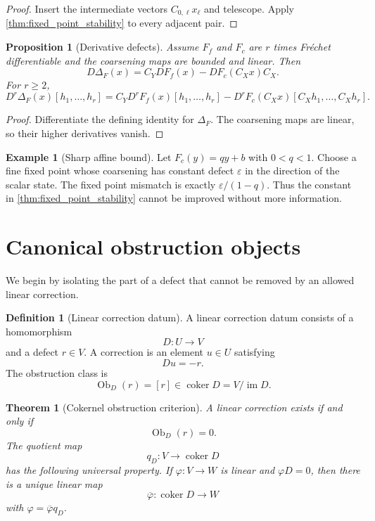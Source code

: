 \documentclass{aomart}
\newtheorem{theorem}{Theorem}[section]
\newtheorem{proposition}[proposition]{Proposition}
\theoremstyle{definition}
\newtheorem{definition}[definition]{Definition}
\newtheorem{example}[example]{Example}
\theoremstyle{remark}
\newcommand{\im}{\operatorname{im}}
\newcommand{\coker}{\operatorname{coker}}
\newcommand{\Ob}{\operatorname{Ob}}
\begin{document}
\begin{proof}
Insert the intermediate vectors $C_{0,\ell}x_\ell$ and telescope.  Apply \cref{thm:fixed_point_stability} to every adjacent pair.
\end{proof}

\begin{proposition}[Derivative defects]\label{prop:derivative_defects}
Assume $F_f$ and $F_c$ are $r$ times Fr\'echet differentiable and the coarsening maps are bounded and linear.  Then
\[
D\Delta_F(x)
=
C_YDF_f(x)-DF_c(C_Xx)C_X.
\]
For $r\ge2$,
\[
D^r\Delta_F(x)[h_1,\ldots,h_r]
=
C_YD^rF_f(x)[h_1,\ldots,h_r]
-
D^rF_c(C_Xx)[C_Xh_1,\ldots,C_Xh_r].
\]
\end{proposition}

\begin{proof}
Differentiate the defining identity for $\Delta_F$.  The coarsening maps are linear, so their higher derivatives vanish.
\end{proof}

\begin{example}[Sharp affine bound]\label{ex:sharp_affine_bound}
Let $F_c(y)=qy+b$ with $0<q<1$.  Choose a fine fixed point whose coarsening has constant defect $\varepsilon$ in the direction of the scalar state.  The fixed point mismatch is exactly $\varepsilon/(1-q)$.  Thus the constant in \cref{thm:fixed_point_stability} cannot be improved without more information.
\end{example}

\section{Canonical obstruction objects}\label{sec:obstruction_objects}

We begin by isolating the part of a defect that cannot be removed by an allowed linear correction.

\begin{definition}[Linear correction datum]\label{def:linear_correction_datum}
A linear correction datum consists of a homomorphism
\[
D:U\longrightarrow V
\]
and a defect $r\in V$.  A correction is an element $u\in U$ satisfying
\[
Du=-r.
\]
The obstruction class is
\[
\Ob_D(r)=[r]\in\coker D=V/\im D.
\]
\end{definition}

\begin{theorem}[Cokernel obstruction criterion]\label{thm:cokernel_obstruction}
A linear correction exists if and only if
\[
\Ob_D(r)=0.
\]
The quotient map
\[
q_D:V\longrightarrow\coker D
\]
has the following universal property.  If $\varphi:V\to W$ is linear and $\varphi D=0$, then there is a unique linear map
\[
\overline\varphi:\coker D\longrightarrow W
\]
with $\varphi=\overline\varphi q_D$.
\end{theorem}
\end{document}
